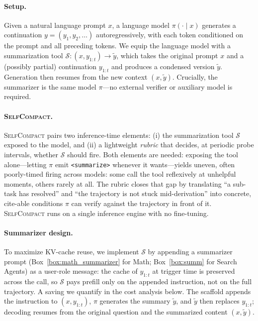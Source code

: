\documentclass{article}
\newcommand{\method}{\textsc{{SelfCompact}}}
\begin{document}
\paragraph{Setup.} Given a natural language prompt $x$, a language model $\pi(\cdot \mid x)$ generates a continuation $y = (y_1, y_2, \ldots)$ autoregressively, with each token conditioned on the prompt and all preceding tokens. We equip the language model with a summarization tool $\mathcal{S}: (x, y_{1:t}) \rightarrow \tilde{y}$, which takes the original prompt $x$ and a (possibly partial) continuation $y_{1:t}$ and produces a condensed version $\tilde{y}$. Generation then resumes from the new context $(x, \tilde{y})$. Crucially, the summarizer is the same model $\pi$---no external verifier or auxiliary model is required.

\paragraph{\method{}.} \method{} pairs two inference-time elements: (i) the summarization tool $\mathcal{S}$ exposed to the model, and (ii) a lightweight \emph{rubric} that decides, at periodic probe intervals, whether $\mathcal{S}$ should fire. Both elements are needed: exposing the tool alone---letting $\pi$ emit \texttt{<summarize>} whenever it wants---yields uneven, often poorly-timed firing across models: some call the tool reflexively at unhelpful moments, others rarely at all. The rubric closes that gap by translating ``a sub-task has resolved'' and ``the trajectory is not stuck mid-derivation'' into concrete, cite-able conditions $\pi$ can verify against the trajectory in front of it. \method{} runs on a single inference engine with no fine-tuning.

\paragraph{Summarizer design.} To maximize KV-cache reuse, we implement $\mathcal{S}$ by appending a summarizer prompt (Box~\ref{box:math_summarizer} for Math; Box~\ref{box:summ} for Search Agents) as a user-role message: the cache of $y_{1:t}$ at trigger time is preserved across the call,
so $\mathcal{S}$ pays prefill only on the appended instruction, not on the full trajectory. A saving we quantify in
the cost analysis below. The scaffold appends the instruction to
$(x, y_{1:t})$, $\pi$ generates the summary $\tilde{y}$, and $\tilde{y}$ then
replaces $y_{1:t}$; decoding resumes from the original question and the summarized content $(x, \tilde{y})$. 
\end{document}
